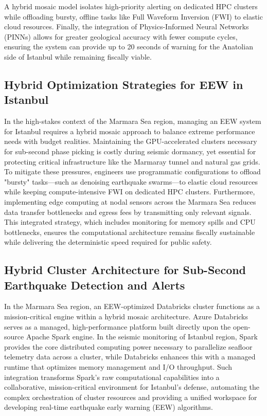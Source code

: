 \documentclass[data,article,submit,pdftex,moreauthors]{Definitions/mdpi}
\begin{document}
A hybrid mosaic model isolates high-priority alerting on dedicated HPC clusters while offloading bursty, offline tasks like Full Waveform Inversion (FWI) to elastic cloud resources. Finally, the integration of Physics-Informed Neural Networks (PINNs) allows for greater geological accuracy with fewer compute cycles, ensuring the system can provide up to 20 seconds of warning for the Anatolian side of Istanbul while remaining fiscally viable.

\subsection{Hybrid Optimization Strategies for EEW in Istanbul}

In the high-stakes context of the Marmara Sea region, managing an EEW system for Istanbul requires a hybrid mosaic approach to balance extreme performance needs with budget realities. Maintaining the GPU-accelerated clusters necessary for sub-second phase picking is costly during seismic dormancy, yet essential for protecting critical infrastructure like the Marmaray tunnel and natural gas grids. To mitigate these pressures, engineers use programmatic configurations to offload "bursty" tasks—such as denoising earthquake swarms—to elastic cloud resources while keeping compute-intensive FWI on dedicated HPC clusters. Furthermore, implementing edge computing at nodal sensors across the Marmara Sea reduces data transfer bottlenecks and egress fees by transmitting only relevant signals. This integrated strategy, which includes monitoring for memory spills and CPU bottlenecks, ensures the computational architecture remains fiscally sustainable while delivering the deterministic speed required for public safety.

\subsection{Hybrid Cluster Architecture for Sub-Second Earthquake Detection and Alerts}

In the Marmara Sea region, an EEW-optimized Databricks cluster functions as a mission-critical engine within a hybrid mosaic architecture. Azure Databricks serves as a managed, high-performance platform built directly upon the open-source Apache Spark engine. In the seismic monitoring of Istanbul region, Spark provides the core distributed computing power necessary to parallelize seafloor telemetry data across a cluster, while Databricks enhances this with a managed runtime that optimizes memory management and I/O throughput. Such integration transforms Spark's raw computational capabilities into a collaborative, mission-critical environment for Istanbul’s defense, automating the complex orchestration of cluster resources and providing a unified workspace for developing real-time earthquake early warning (EEW) algorithms.
\end{document}
